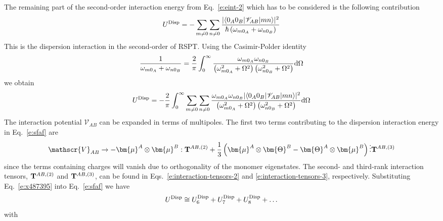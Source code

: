 \documentclass[a4paper,titlepage,twoside,fleqn,12pt]{book}
\newcommand{\BM}[1]{\bm{#1}}
\begin{document}
\begin{refsection}
The remaining part of the second\hyp{}order interaction
energy from Eq.~\eqref{e:eint-2} which has to be considered
is the following contribution
%
\begin{equation} \label{e:eint-2-disp}
U^{\rm Disp} = - \sum_{m\ne 0} \sum_{n\ne 0} \frac{
\lvert \langle 0_A0_B \lvert \mathscr{V}_{AB} \rvert mn \rangle \rvert^2
}{\hbar \left( \omega_{m0_A} + \omega_{n0_B}\right)}
\end{equation}
%
This is the dispersion interaction in the second\hyp{}order of RSPT.
Using the Casimir\hyp{}Polder identity
%
\begin{equation} \label{e:Casimir-Polder}
\frac{1}{\omega_{m0_A}+\omega_{n0_B}} =\frac{2}{\pi} \int_0^{\infty} 
\frac{\omega_{m0_A}\omega_{n0_B}}
{\left(\omega_{m0_A}^2+\Omega^2\right)\left(\omega_{n0_B}^2+\Omega^2\right)} {\rm d}\Omega
\end{equation}
%
we obtain
%
\begin{equation} \label{e:sfaf}
U^{\rm Disp} =-\frac{2}{\pi}\int_0^{\infty} \sum_{m\ne 0} \sum_{n\ne 0}
\frac{\omega_{m0_A}\omega_{n0_B}
\lvert \langle 0_A0_B \lvert \mathscr{V}_{AB} \rvert mn \rangle \rvert^2
}
{\left(\omega_{m0_A}^2+\Omega^2\right)\left(\omega_{n0_B}^2+\Omega^2\right)} {\rm d}\Omega
\end{equation}
%
The interaction potential $\mathscr{V}_{AB}$ can be expanded in terms of multipoles. 
The first two terms contributing to the dispersion interaction energy 
in Eq.~\eqref{e:sfaf} are \citep{Smith.Ruedenberg.Gordon.Slipchenko.JCP.2012}
%
\begin{equation} \label{e:x487395}
\mathscr{V}_{AB} \rightarrow
- {\BM \mu}^A \otimes {\BM \mu}^B : {\bf T}^{AB,(2)} + \frac{1}{3} 
\left( 
 {\BM \mu}^A \otimes {\BM \Theta}^B - {\BM \Theta}^A \otimes {\BM \mu}^B
\right) \vdots {\bf T}^{AB,(3)}
\end{equation}
%
since the terms containing charges will vanish due to orthogonality 
of the monomer eigenstates. The second- and third\hyp{}rank interaction tensors,
${\bf T}^{AB,(2)}$ and ${\bf T}^{AB,(3)}$, 
can be found in Eqs.~\eqref{e:interaction-tensors-2} 
and \eqref{e:interaction-tensors-3}, respectively.
Substituting Eq.~\eqref{e:x487395} into Eq.~\eqref{e:sfaf} we have
%
\begin{equation}
 U^{\rm Disp} \cong  U^{\rm Disp}_6 + U^{\rm Disp}_7 + U^{\rm Disp}_8 + \ldots
\end{equation}
%
with
%
\begin{subequations} \label{e:udisp-6-7-8}
 \begin{align}

\end{align}
\end{subequations}
\end{refsection}
\end{document}
